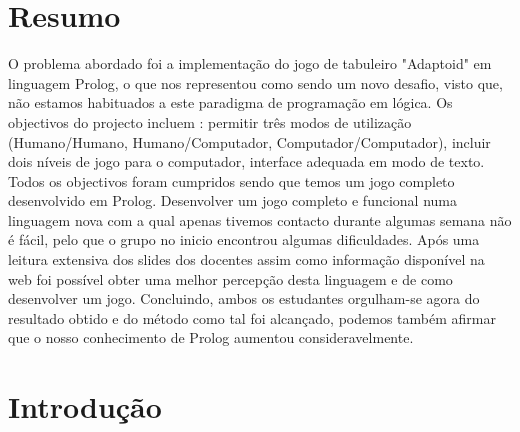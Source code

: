 \documentclass[a4paper]{article}
\begin{document}

\newpage

\section*{Resumo}
O problema abordado foi a implementação do jogo de tabuleiro "Adaptoid" em linguagem Prolog, o que nos representou como sendo um novo desafio, visto que, não estamos habituados a este paradigma de programação em lógica. Os objectivos do projecto incluem : permitir três modos de utilização (Humano/Humano, Humano/Computador, Computador/Computador), incluir dois níveis de jogo para o computador, interface adequada em modo de texto. Todos os objectivos foram cumpridos sendo que temos um jogo completo desenvolvido em Prolog. Desenvolver um jogo completo e funcional numa linguagem nova com a qual apenas tivemos contacto durante algumas semana não é fácil, pelo que o grupo no inicio encontrou algumas dificuldades. Após uma leitura extensiva dos slides dos docentes assim como informação disponível na web foi possível obter uma melhor percepção desta linguagem e de como desenvolver um jogo.
Concluindo, ambos os estudantes orgulham-se agora do resultado obtido e do método como tal foi alcançado, podemos também afirmar que o nosso conhecimento de Prolog aumentou consideravelmente.
\newpage

\tableofcontents



\newpage

\section{Introdução}
\end{document}
